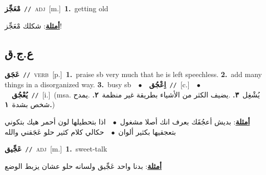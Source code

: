 \documentclass[10pt,a4paper,twoside]{article} %
\begin{document}
\begin{multicols}{2}
{\setlength\topsep{0pt}\textbf{\foreignlanguage{arabic}{مْعَجِّز}}\ {\color{gray}\texttt{//}\color{black}}\ \textsc{adj}\ [m.]\ \textbf{1.}~getting old\  \begin{flushright}\color{gray}\foreignlanguage{arabic}{\textbf{\underline{\foreignlanguage{arabic}{أمثلة}}}: شكلك مْعَجِّز!}\end{flushright}\color{black}} \vspace{2mm}

\vspace{-3mm}
\subsection*{\color{blue}\foreignlanguage{arabic}{ع.ج.ق}\color{blue}{}} 

{\setlength\topsep{0pt}\textbf{\foreignlanguage{arabic}{عَجَق}}\ {\color{gray}\texttt{//}\color{black}}\ \textsc{verb}\ [p.]\ \textbf{1.}~praise sb very much that he is left speechless.  \textbf{2.}~add many things in a disorganized way.  \textbf{3.}~busy sb\ \ $\bullet$\ \ \setlength\topsep{0pt}\textbf{\foreignlanguage{arabic}{اِعْجُق}}\ {\color{gray}\texttt{//}\color{black}}\ [c.]\ \ $\bullet$\ \ \setlength\topsep{0pt}\textbf{\foreignlanguage{arabic}{يُعْجُق}}\ {\color{gray}\texttt{//}\color{black}}\ [i.]\ \color{gray}(msa. \foreignlanguage{arabic}{يُشْغِل}~\foreignlanguage{arabic}{\textbf{٣.}}  .\foreignlanguage{arabic}{يضيف الكثر من الأشياء بطريقة غير منظمة}~\foreignlanguage{arabic}{\textbf{٢.}}  .\foreignlanguage{arabic}{يمدح شخص بشدة}~\foreignlanguage{arabic}{\textbf{١.}})\color{black}\  \begin{flushright}\color{gray}\foreignlanguage{arabic}{\textbf{\underline{\foreignlanguage{arabic}{أمثلة}}}: بديش أعجُقَك بعرف انك أصلا مشغول\ $\bullet$\ \  اذا بتحطيلها لون أحمر هيك بتكوني بتعجقيها بكثير ألوان\ $\bullet$\ \  حكالي كلام كثير حلو عَجَقني والله}\end{flushright}\color{black}} \vspace{2mm}

{\setlength\topsep{0pt}\textbf{\foreignlanguage{arabic}{عَجِّيق}}\ {\color{gray}\texttt{//}\color{black}}\ \textsc{adj}\ [m.]\ \textbf{1.}~sweet-talk\  \begin{flushright}\color{gray}\foreignlanguage{arabic}{\textbf{\underline{\foreignlanguage{arabic}{أمثلة}}}: بدنا واحد عَجِّيق ولسانه حلو عشان يزبط الوضع}\end{flushright}\color{black}} \vspace{2mm}


\end{multicols}
\end{document}
